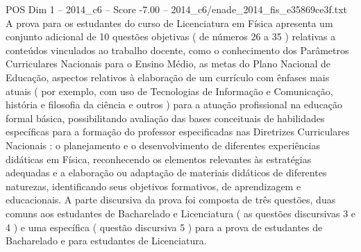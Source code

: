 \begin{textsample}{POS Dim 1 – 2014\_c6 – Score -7.00 – 2014\_c6/enade\_2014\_fis\_e35869ce3f.txt}
A prova para os estudantes do curso de Licenciatura em Física apresenta um conjunto adicional de 10 questões objetivas ( de números 26 a 35 ) relativas a conteúdos vinculados ao trabalho docente, como o conhecimento dos Parâmetros Curriculares Nacionais para o Ensino Médio, as metas do Plano Nacional de Educação, aspectos relativos à elaboração de um currículo com ênfases mais atuais ( por exemplo, com uso de Tecnologias de Informação e Comunicação, história e filosofia da ciência e outros ) para a atuação profissional na educação formal básica, possibilitando avaliação das bases conceituais de habilidades específicas para a formação do professor especificadas nas Diretrizes Curriculares Nacionais : o planejamento e o desenvolvimento de diferentes experiências didáticas em Física, reconhecendo os elementos relevantes às estratégias adequadas e a elaboração ou adaptação de materiais didáticos de diferentes naturezas, identificando seus objetivos formativos, de aprendizagem e educacionais.
A parte discursiva da prova foi composta de três questões, duas comuns aos estudantes de Bacharelado e Licenciatura ( as questões discursivas 3 e 4 ) e uma específica ( questão discursiva 5 ) para a prova de estudantes de Bacharelado e para estudantes de Licenciatura.

\end{textsample}

